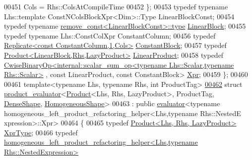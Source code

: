 \begin{DoxyCode}
00451     Cols = Rhs::ColsAtCompileTime
00452   \};
00453   \textcolor{keyword}{typedef} \textcolor{keyword}{typename} Lhs::template ConstNColsBlockXpr<Dim>::Type          LinearBlockConst;
00454   \textcolor{keyword}{typedef} \textcolor{keyword}{typename} \hyperlink{group___sparse_core___module}{remove\_const<LinearBlockConst>::type}                
       \hyperlink{group___sparse_core___module}{LinearBlock};
00455   \textcolor{keyword}{typedef} \textcolor{keyword}{typename} Lhs::ConstColXpr                                     ConstantColumn;
00456   \textcolor{keyword}{typedef} \hyperlink{group___core___module_class_eigen_1_1_replicate}{Replicate<const ConstantColumn,1,Cols>}                     
         \hyperlink{group___core___module_class_eigen_1_1_replicate}{ConstantBlock};
00457   \textcolor{keyword}{typedef} \hyperlink{group___core___module_class_eigen_1_1_product}{Product<LinearBlock,Rhs,LazyProduct>}                         
       \hyperlink{group___core___module_class_eigen_1_1_product}{LinearProduct};
00458   \textcolor{keyword}{typedef} 
      \hyperlink{group___core___module_class_eigen_1_1_cwise_binary_op}{CwiseBinaryOp<internal::scalar\_sum\_op<typename Lhs::Scalar,typename Rhs::Scalar>}
      , \textcolor{keyword}{const} LinearProduct, \textcolor{keyword}{const} ConstantBlock> \hyperlink{group___core___module_class_eigen_1_1_cwise_binary_op}{Xpr};
00459 \};
00460 
00461 \textcolor{keyword}{template}<\textcolor{keyword}{typename} Lhs, \textcolor{keyword}{typename} Rhs, \textcolor{keywordtype}{int} ProductTag>
\hyperlink{struct_eigen_1_1internal_1_1product__evaluator_3_01_product_3_01_lhs_00_01_rhs_00_01_lazy_producdc5bcb3d77429f754f91ead5635235a9}{00462} \textcolor{keyword}{struct }\hyperlink{struct_eigen_1_1internal_1_1product__evaluator}{product\_evaluator}<\hyperlink{group___core___module_class_eigen_1_1_product}{Product}<Lhs, Rhs, LazyProduct>, ProductTag, 
      \hyperlink{struct_eigen_1_1_dense_shape}{DenseShape}, \hyperlink{struct_eigen_1_1_homogeneous_shape}{HomogeneousShape}>
00463  : \textcolor{keyword}{public} \hyperlink{struct_eigen_1_1internal_1_1evaluator}{evaluator}<typename homogeneous\_left\_product\_refactoring\_helper<Lhs,typename Rhs::NestedE
      xpression>::Xpr>
00464 \{
00465   \textcolor{keyword}{typedef} \hyperlink{group___core___module_class_eigen_1_1_product}{Product<Lhs, Rhs, LazyProduct>} \hyperlink{group___core___module_class_eigen_1_1_product}{XprType};
00466   \textcolor{keyword}{typedef} 
      \hyperlink{struct_eigen_1_1internal_1_1homogeneous__left__product__refactoring__helper}{homogeneous\_left\_product\_refactoring\_helper<Lhs,typename Rhs::NestedExpression>}

\end{DoxyCode}
